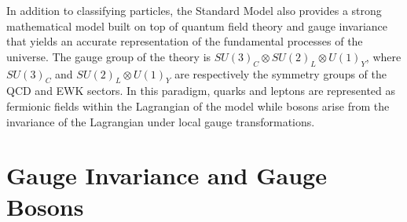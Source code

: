   In addition to classifying particles, the Standard Model also provides a strong mathematical model built on top of quantum field theory and gauge invariance that yields an accurate representation of the fundamental processes of the universe. The gauge group of the theory is $ SU(3)_C \otimes SU(2)_L \otimes U(1)_Y $, where $ SU(3)_C $ and $ SU(2)_L \otimes U(1)_Y $ are respectively the symmetry groups of the QCD and EWK sectors. In this paradigm, quarks and leptons are represented as fermionic fields within the Lagrangian of the model while bosons arise from the invariance of the Lagrangian under local gauge transformations. \\

  \section{Gauge Invariance and Gauge Bosons}

